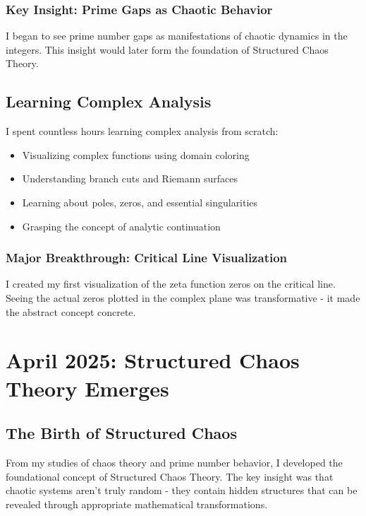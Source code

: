 \documentclass[12pt]{article}
\begin{document}
\subsubsection{Key Insight: Prime Gaps as Chaotic Behavior}

I began to see prime number gaps as manifestations of chaotic dynamics in the integers. This insight would later form the foundation of Structured Chaos Theory.

\subsection{Learning Complex Analysis}

I spent countless hours learning complex analysis from scratch:
\begin{itemize}
    \item Visualizing complex functions using domain coloring
    \item Understanding branch cuts and Riemann surfaces
    \item Learning about poles, zeros, and essential singularities
    \item Grasping the concept of analytic continuation
\end{itemize}

\subsubsection{Major Breakthrough: Critical Line Visualization}

I created my first visualization of the zeta function zeros on the critical line. Seeing the actual zeros plotted in the complex plane was transformative - it made the abstract concept concrete.

\section{April 2025: Structured Chaos Theory Emerges}

\subsection{The Birth of Structured Chaos}

From my studies of chaos theory and prime number behavior, I developed the foundational concept of Structured Chaos Theory. The key insight was that chaotic systems aren't truly random - they contain hidden structures that can be revealed through appropriate mathematical transformations.
\end{document}
